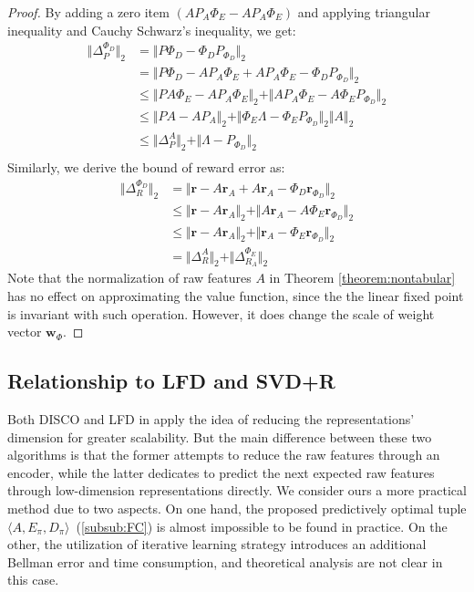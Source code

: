 \documentclass[onecolumn, conference]{IEEEtran}
\begin{document}
\begin{proof}
	 By adding a zero item $(AP_A\Phi_E - AP_A\Phi_E)$ and applying triangular inequality and Cauchy Schwarz's inequality, we get:
	 \begin{align*}
	 	\Vert \Delta_P^{\Phi_D}\Vert_2 & = \Vert P\Phi_D - \Phi_DP_{\Phi_D}\Vert_2\\
	 	& =  \Vert P\Phi_D - AP_A\Phi_E + AP_A\Phi_E - \Phi_DP_{\Phi_D}\Vert_2 \\
	 	& \le \Vert  PA\Phi_E - AP_A\Phi_E\Vert_2 + \Vert AP_A\Phi_E - A\Phi_E P_{\Phi_D}\Vert_2\\
	 	& \le \Vert PA -AP_A\Vert_2 + \Vert \Phi_E \Lambda - \Phi_E P_{\Phi_D}\Vert_2 \Vert A\Vert_2\\
	 	& \le  \Vert \Delta_P^A\Vert_2 + \Vert \Lambda - P_{\Phi_D}\Vert_2\\
	 \end{align*}
	 Similarly, we derive the bound of reward error as:
	 \begin{align*}
	 	\Vert \Delta_R^{\Phi_D}\Vert_2 &= \Vert \boldsymbol{r} - A\boldsymbol{r}_A +A\boldsymbol{r}_A - \Phi_D \boldsymbol{r}_{\Phi_D} \Vert_2\\
	 	&\le \Vert \boldsymbol{r} - A\boldsymbol{r}_A \Vert_2+\Vert A\boldsymbol{r}_A - A\Phi_E \boldsymbol{r}_{\Phi_D} \Vert_2\\
	 	&\le \Vert \boldsymbol{r} - A\boldsymbol{r}_A \Vert_2 + \Vert \boldsymbol{r}_A - \Phi_E \boldsymbol{r}_{\Phi_D} \Vert_2 \\
	 	& = \Vert \Delta_R^{A}\Vert_2 + \Vert \Delta_{R_A}^{\Phi_E} \Vert_2
	 \end{align*}
	 Note that the normalization of raw features $A$ in Theorem \ref{theorem:nontabular} has no effect on approximating the value function, since the the linear fixed point is invariant with such operation. However, it does change the scale of weight vector $\boldsymbol{w}_\Phi$.
\end{proof}

\subsection{Relationship to LFD and SVD+R}
Both DISCO and LFD in \cite{Song2016LinearFE} apply the idea of reducing the representations' dimension for greater scalability. But the main difference between these two algorithms is that the former attempts to reduce the raw features through an encoder, while the latter dedicates to predict the next expected raw features through low-dimension representations directly. We consider ours a more practical method due to two aspects. On one hand, the proposed predictively optimal tuple $\langle A,E_\pi,D_\pi\rangle$~(\ref{subsub:FC}) is almost impossible to be found in practice. On the other, the utilization of iterative learning strategy introduces an additional Bellman error and time consumption, and theoretical analysis are not clear in this case. 
\end{document}
